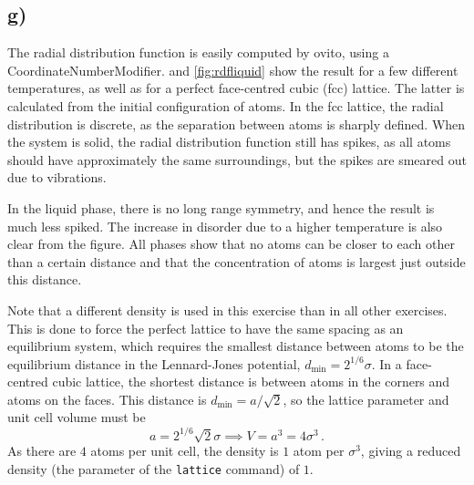 \documentclass[11pt,british,a4paper]{report}
\begin{document}
\subsection*{g)}
The radial distribution function is easily computed by ovito, using a CoordinateNumberModifier.
 and \vref{fig:rdfliquid} show the result for a few different temperatures, as well as for a perfect face-centred cubic (fcc) lattice.
The latter is calculated from the initial configuration of atoms.
In the fcc lattice, the radial distribution is discrete, as the separation between atoms is sharply defined.
When the system is solid, the radial distribution function still has spikes, as all atoms should have approximately the same surroundings, but the spikes are smeared out due to vibrations.

In the liquid phase, there is no long range symmetry, and hence the result is much less spiked.
The increase in disorder due to a higher temperature is also clear from the figure.
All phases show that no atoms can be closer to each other than a certain distance and that the concentration of atoms is largest just outside this distance.

Note that a different density is used in this exercise than in all other exercises.
This is done to force the perfect lattice to have the same spacing as an equilibrium system, which requires the smallest distance between atoms to be the equilibrium distance in the Lennard-Jones potential, \(d_{\min{}} = 2^{1/6}\sigma\).
In a face-centred cubic lattice, the shortest distance is between atoms in the corners and atoms on the faces.
This distance is \(d_{\min{}}=a/\sqrt{2}\), so the lattice parameter and unit cell volume must be
\[
    a = 2^{1/6}\sqrt{2}\sigma \implies V = a^3 = 4\sigma^3\,.
\]
As there are \(4\) atoms per unit cell, the density is \(1\) atom per \(\sigma^3\), giving a reduced density (the parameter of the \texttt{lattice} command) of \(1\).
\end{document}
